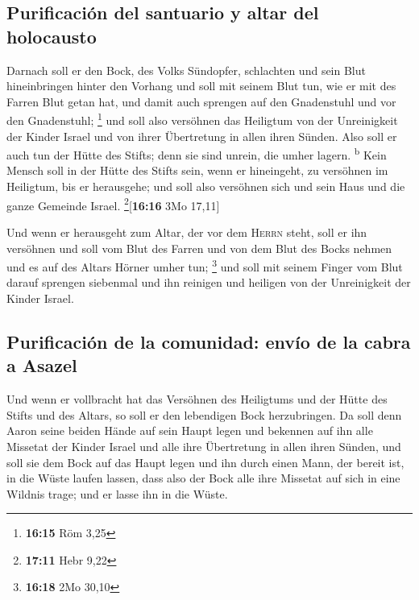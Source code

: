 \hypertarget{purificaciuxf3n-del-santuario-y-altar-del-holocausto}{%
\subsection{Purificación del santuario y altar del
holocausto}\label{purificaciuxf3n-del-santuario-y-altar-del-holocausto}}

 Darnach soll er den Bock, des Volks Sündopfer,
schlachten und sein Blut hineinbringen hinter den Vorhang und soll mit
seinem Blut tun, wie er mit des Farren Blut getan hat, und damit auch
sprengen auf den Gnadenstuhl und vor den Gnadenstuhl; \footnote{\textbf{16:15}
  Röm 3,25}  und soll also versöhnen das Heiligtum von
der Unreinigkeit der Kinder Israel und von ihrer Übertretung in allen
ihren Sünden. Also soll er auch tun der Hütte des Stifts; denn sie sind
unrein, die umher lagern. \textsuperscript{b}  Kein
Mensch soll in der Hütte des Stifts sein, wenn er hineingeht, zu
versöhnen im Heiligtum, bis er herausgehe; und soll also versöhnen sich
und sein Haus und die ganze Gemeinde Israel.
\footnote{\textbf{17:11} Hebr 9,22}{[}\textbf{16:16} 3Mo 17,11{]}

 Und wenn er herausgeht zum Altar, der vor dem
\textsc{Herrn} steht, soll er ihn versöhnen und soll vom Blut des Farren
und von dem Blut des Bocks nehmen und es auf des Altars Hörner umher
tun; \footnote{\textbf{16:18} 2Mo 30,10}  und soll mit
seinem Finger vom Blut darauf sprengen siebenmal und ihn reinigen und
heiligen von der Unreinigkeit der Kinder Israel.

\hypertarget{purificaciuxf3n-de-la-comunidad-envuxedo-de-la-cabra-a-asazel}{%
\subsection{Purificación de la comunidad: envío de la cabra a
Asazel}\label{purificaciuxf3n-de-la-comunidad-envuxedo-de-la-cabra-a-asazel}}

 Und wenn er vollbracht hat das Versöhnen des Heiligtums
und der Hütte des Stifts und des Altars, so soll er den lebendigen Bock
herzubringen.  Da soll denn Aaron seine beiden Hände auf
sein Haupt legen und bekennen auf ihn alle Missetat der Kinder Israel
und alle ihre Übertretung in allen ihren Sünden, und soll sie dem Bock
auf das Haupt legen und ihn durch einen Mann, der bereit ist, in die
Wüste laufen lassen,  dass also der Bock alle ihre
Missetat auf sich in eine Wildnis trage; und er lasse ihn in die Wüste.

